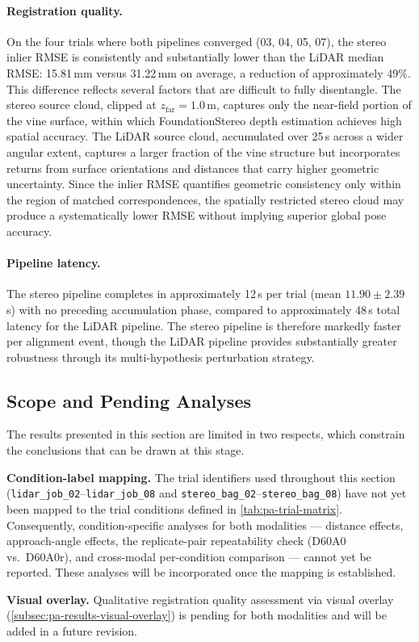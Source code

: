 \paragraph{Registration quality.} On the four trials where both pipelines converged (03, 04, 05, 07), the stereo inlier RMSE is consistently and substantially lower than the LiDAR median RMSE: 15.81\,mm versus 31.22\,mm on average, a reduction of approximately 49\%. This difference reflects several factors that are difficult to fully disentangle. The stereo source cloud, clipped at $z_\mathrm{far} = 1.0$\,m, captures only the near-field portion of the vine surface, within which FoundationStereo depth estimation achieves high spatial accuracy. The LiDAR source cloud, accumulated over 25\,s across a wider angular extent, captures a larger fraction of the vine structure but incorporates returns from surface orientations and distances that carry higher geometric uncertainty. Since the inlier RMSE quantifies geometric consistency only within the region of matched correspondences, the spatially restricted stereo cloud may produce a systematically lower RMSE without implying superior global pose accuracy.

\paragraph{Pipeline latency.} The stereo pipeline completes in approximately 12\,s per trial (mean $11.90 \pm 2.39$\,s) with no preceding accumulation phase, compared to approximately 48\,s total latency for the LiDAR pipeline. The stereo pipeline is therefore markedly faster per alignment event, though the LiDAR pipeline provides substantially greater robustness through its multi-hypothesis perturbation strategy.

\subsection{Scope and Pending Analyses}
\label{subsec:pa-results-scope}

The results presented in this section are limited in two respects, which constrain the conclusions that can be drawn at this stage.

\textbf{Condition-label mapping.} The trial identifiers used throughout this section (\texttt{lidar\_job\_02}--\texttt{lidar\_job\_08} and \texttt{stereo\_bag\_02}--\texttt{stereo\_bag\_08}) have not yet been mapped to the trial conditions defined in \cref{tab:pa-trial-matrix}. Consequently, condition-specific analyses for both modalities --- distance effects, approach-angle effects, the replicate-pair repeatability check (D60A0 vs.\ D60A0r), and cross-modal per-condition comparison --- cannot yet be reported. These analyses will be incorporated once the mapping is established.

\textbf{Visual overlay.} Qualitative registration quality assessment via visual overlay (\cref{subsec:pa-results-visual-overlay}) is pending for both modalities and will be added in a future revision.